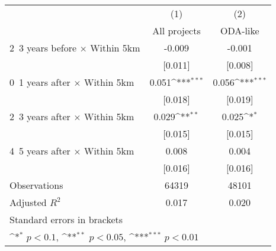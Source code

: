 {
\def\sym#1{\ifmmode^{#1}\else\(^{#1}\)\fi}
\begin{tabular}{l*{2}{c}}
\hline\hline
                    &\multicolumn{1}{c}{(1)}&\multicolumn{1}{c}{(2)}\\
                    &\multicolumn{1}{c}{All projects}&\multicolumn{1}{c}{ODA-like}\\
\hline
2~3 years before × Within 5km&      -0.009         &      -0.001         \\
                    &     [0.011]         &     [0.008]         \\
0~1 years after × Within 5km&       0.051\sym{***}&       0.056\sym{***}\\
                    &     [0.018]         &     [0.019]         \\
2~3 years after × Within 5km&       0.029\sym{**} &       0.025\sym{*}  \\
                    &     [0.015]         &     [0.015]         \\
4~5 years after × Within 5km&       0.008         &       0.004         \\
                    &     [0.016]         &     [0.016]         \\
\hline
Observations        &       64319         &       48101         \\
Adjusted \(R^{2}\)  &       0.017         &       0.020         \\
\hline\hline
\multicolumn{3}{l}{\footnotesize Standard errors in brackets}\\
\multicolumn{3}{l}{\footnotesize \sym{*} \(p<0.1\), \sym{**} \(p<0.05\), \sym{***} \(p<0.01\)}\\
\end{tabular}
}
